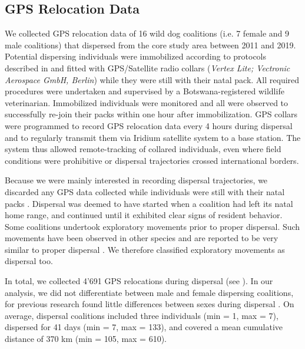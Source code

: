 \documentclass[abstract=on,10pt,a4paper,bibliography=totocnumbered]{scrartcl}
\begin{document}
\subsection{GPS Relocation Data}
We collected GPS relocation data of 16 wild dog coalitions (i.e. 7 female and 9
male coalitions) that dispersed from the core study area between 2011 and 2019.
Potential dispersing individuals were immobilized according to protocols
described in \cite{Osofsky.1996} and fitted with GPS/Satellite radio collars
(\textit{Vertex Lite; Vectronic Aerospace GmbH, Berlin}) while they were still
with their natal pack. All required procedures were undertaken and supervised by
a Botswana-registered wildlife veterinarian. Immobilized individuals were
monitored and all were observed to successfully re-join their packs within one
hour after immobilization. GPS collars were programmed to record GPS relocation
data every 4 hours during dispersal and to regularly transmit them via Iridium
satellite system to a base station. The system thus allowed remote-tracking of
collared individuals, even where field conditions were prohibitive or dispersal
trajectories crossed international borders.

Because we were mainly interested in recording dispersal trajectories, we
discarded any GPS data collected while individuals were still with their natal
packs \citep{Cozzi.2020}. Dispersal was deemed to have started when a coalition
had left its natal home range, and continued until it exhibited clear signs of
resident behavior. Some coalitions undertook exploratory movements prior to
proper dispersal. Such movements have been observed in other species and are
reported to be very similar to proper dispersal \citep{Killeen.2014}. We
therefore classified exploratory movements as dispersal too.

In total, we collected 4'691 GPS relocations during dispersal (see
). In our analysis, we did not differentiate between male and
female dispersing coalitions, for previous research found little differences
between sexes during dispersal \citep{Woodroffe.2019, Cozzi.2020}. On average,
dispersal coalitions included three individuals (min = 1, max = 7), dispersed
for 41 days (min = 7, max = 133), and covered a mean cumulative distance of 370
km (min = 105, max = 610).
\end{document}
